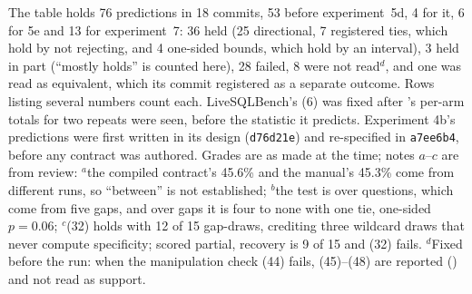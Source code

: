 The table holds 76 predictions in 18 commits, 53 before experiment~5d, 4
for it, 6 for 5e and 13 for experiment~7: 36 held (25 directional, 7
registered ties, which hold by not rejecting, and 4 one-sided bounds,
which hold by an interval), 3 held in part (``mostly holds'' is counted
here), 28 failed, 8 were not read$^d$,
and one was read as equivalent, which its commit registered as a separate
outcome. Rows listing several numbers count each. LiveSQLBench's (6) was fixed after \mQwen{}'s per-arm totals for two
repeats were seen, before the statistic it predicts. Experiment 4b's
predictions were first written in its design (\texttt{d76d21e}) and
re-specified in \texttt{a7ee6b4}, before any contract was authored. Grades
are as made at the time; notes $a$--$c$ are from review: $^a$the compiled
contract's 45.6\% and the manual's 45.3\% come from different runs, so
``between'' is not established; $^b$the test is over questions, which come
from five gaps, and over gaps it is four to none with one tie, one-sided
$p{=}0.06$; $^c$(32) holds with 12 of 15 gap-draws, crediting three
wildcard draws that never compute specificity; scored partial, recovery is
9 of 15 and (32) fails. $^d$Fixed before the run: when the manipulation
check (44) fails, (45)--(48) are reported () and not read as
support.
